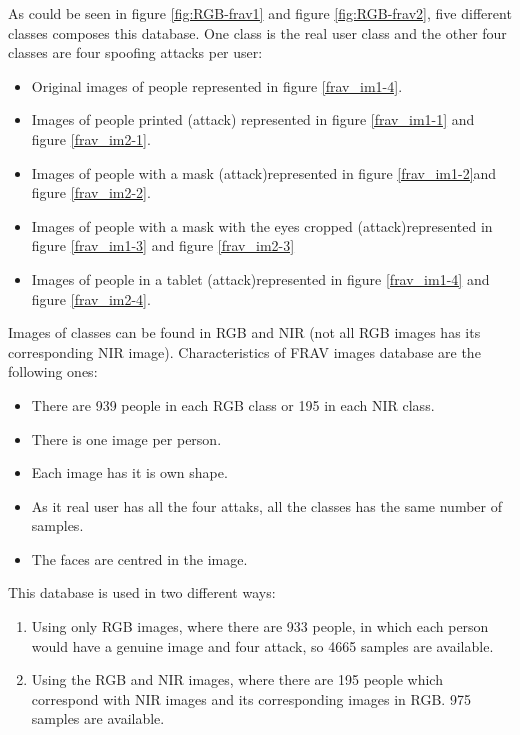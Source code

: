 As could be seen in figure \ref{fig:RGB-frav1} and figure \ref{fig:RGB-frav2}, five different classes composes this database. One class is the real user class and the other four classes are four spoofing attacks per user:\\

\begin{itemize}
 \item Original images of people represented in figure \ref{frav_im1-4}.
 \item Images of people printed (attack) represented in figure \ref{frav_im1-1} and figure \ref{frav_im2-1}.
 \item Images of people with a mask (attack)represented in figure \ref{frav_im1-2}and figure \ref{frav_im2-2}.
 \item Images of people with a mask with the eyes cropped (attack)represented in figure \ref{frav_im1-3} and figure \ref{frav_im2-3}
 \item Images of people in a tablet (attack)represented in figure \ref{frav_im1-4} and figure \ref{frav_im2-4}.\\
 \end{itemize}

Images of classes can be found in RGB and NIR (not all RGB images has its corresponding NIR image). Characteristics of FRAV images database are the following ones:\\

\begin{itemize}
 \item There are 939 people in each RGB class or 195 in each NIR class.
\item There is one image per person.
\item Each image has it is own shape.
\item As it real user has all the four attaks, all the classes has the same number of samples.
\item The faces are centred in the image.\\
\end{itemize}

This database is used in two different ways:

\begin{enumerate}
  \item Using only RGB images, where there are 933 people, in which each person would have a genuine image and four attack, so 4665 samples are available.
  \item Using the RGB and NIR images, where there are 195 people which correspond with NIR images and its corresponding images in RGB. 975 samples are available.
\end{enumerate}

